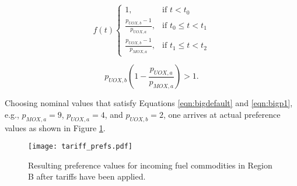 \begin{equation}\label{eqn:tariff}
f(t)
\begin{cases}
1, & \text{if } t < t_0 \\
\frac{p_{UOX, b} - 1}{p_{UOX, a}}, & \text{if } t_0 \leq t < t_1 \\
\frac{p_{UOX, b} - 1}{p_{MOX, a}}, & \text{if } t_1 \leq t < t_2
\end{cases} 
\end{equation}

\begin{equation}\label{eqn:bigp1}
  p_{UOX, b} \left( 1 - \frac{p_{UOX, a}}{p_{MOX, a}} \right) > 1.
\end{equation}

Choosing nominal values that satisfy Equations \ref{eqn:bigdefault} and
\ref{eqn:bigp1}, e.g., $p_{MOX, a} = 9$, $p_{UOX, a} = 4$, and $p_{UOX, b} = 2$,
one arrives at actual preference values as shown in Figure \ref{fig:prefs}.

\begin{figure}
  \begin{center}
    \texttt{[image: tariff\_prefs.pdf]}
    \caption[]{
      \label{fig:prefs}
      Resulting preference values for incoming fuel commodities in Region B
      after tariffs have been applied.}
  \end{center}
\end{figure}





